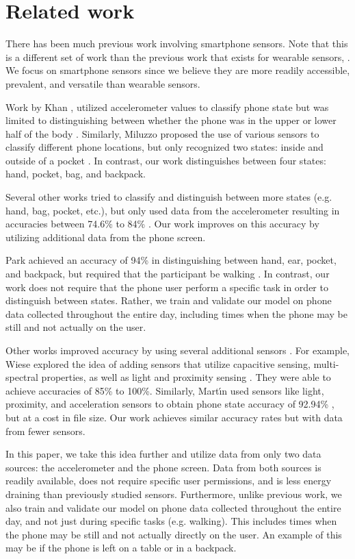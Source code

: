 \section{Related work}
There has been much previous work involving smartphone sensors.
Note that this is a different set of work than the previous work that exists for wearable sensors, \cite{Kunze2005,Atallah}.
We focus on smartphone sensors since we believe they are more readily accessible, prevalent, and versatile than wearable sensors.

Work by Khan \et, utilized accelerometer values to classify phone state 
but was limited to distinguishing between whether the phone was in the upper or lower half of the body \cite{Khan2010}.
Similarly, Miluzzo \et proposed the use of various sensors to classify different phone locations, 
but only recognized two states: inside and outside of a pocket \cite{Miluzzo2010}.
In contrast, our work distinguishes between four states: hand, pocket, bag, and backpack. 

Several other works tried to classify and distinguish between more states (e.g. hand, bag, pocket, etc.), but only used data from the accelerometer resulting in accuracies between 74.6\% to 84\% \cite{Fujinami2013,Coksun15}. 
Our work improves on this accuracy by utilizing additional data from the phone screen.

Park \et achieved an accuracy of 94\% in distinguishing between hand, ear, pocket, and backpack, but required that the participant be walking \cite{Park2012}. 
In contrast, our work does not require that the phone user perform a specific task in order to distinguish between states.
Rather, we train and validate our model on phone data collected throughout the entire day, 
 including times when the phone may be still and not actually on the user. 

Other works improved accuracy by using several additional sensors \cite{Yang13}.
For example, Wiese \et explored the idea of adding sensors that utilize capacitive sensing,  multi-spectral properties, as well as light and proximity sensing \cite{Wiese2013}.
They were able to achieve accuracies of 85\% to 100\%.
Similarly, Mart\'{\i}n \et used sensors like light, proximity, and acceleration sensors
to obtain phone state accuracy of 92.94\% \cite{Martin2013}, but at a cost in file size.
Our work achieves similar accuracy rates but with data from fewer sensors.  

In this paper, we take this idea further and utilize data from only two data sources: the accelerometer and the phone screen. 
Data from both sources is readily available, does not require specific user permissions, and is less energy draining than previously studied sensors.
Furthermore, unlike previous work, we also train and validate our model on phone data collected throughout the entire day, and not just during specific tasks (e.g. walking).
This includes times when the phone may be still and not actually directly on the user.
An example of this may be if the phone is left on a table or in a backpack. 







